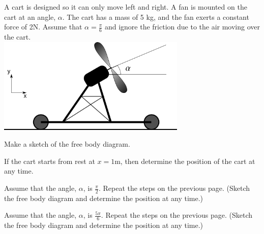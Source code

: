 \begin{problem}
\item A cart is designed so it can only move left and right. A fan is
  mounted on the cart at an angle, $\alpha$. The cart has a mass of 5
  kg, and the fan exerts a constant force of 2N. Assume that
  $\alpha=\frac{\pi}{6}$ and ignore the friction due to the air moving
  over the cart.  \\
  \includegraphics[width=9cm]{ink/week6/airCart}
  \begin{subproblem}
    \item Make a sketch of the free body diagram.
      \vspace{10em}
    \item If the cart starts from rest at $x=1$m, then determine the
      position of the cart at any time.
      \vfill
      \clearpage
    \item Assume that the angle, $\alpha$, is $\frac{\pi}{2}$. Repeat
      the steps on the previous page. (Sketch the free body diagram
      and determine the position at any time.)
      \vfill
      \clearpage
    \item Assume that the angle, $\alpha$, is $\frac{5\pi}{6}$. Repeat
      the steps on the previous page. (Sketch the free body diagram
      and determine the position at any time.)
      \vfill
  \end{subproblem}
\end{problem}


